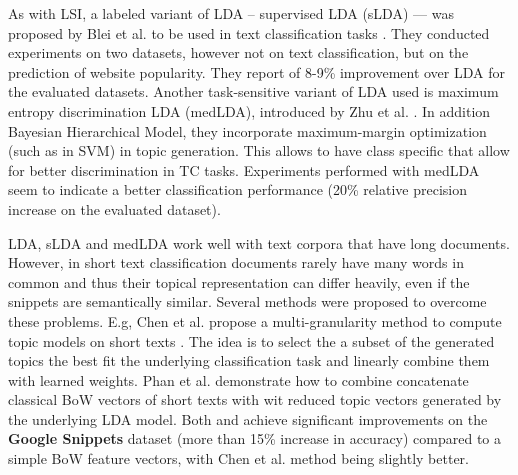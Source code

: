 As with LSI, a labeled variant of LDA -- supervised LDA (sLDA) --- was 
proposed by Blei et al. to be used in text classification tasks \cite{Blei2010}.
They conducted experiments on two datasets, however not on text classification, but on the prediction of
website popularity. They report of 8-9\% improvement over LDA for the evaluated
datasets. Another task-sensitive variant of LDA used is maximum entropy
discrimination LDA (medLDA), introduced by Zhu et al.
\cite{Zhu2012}. In addition Bayesian Hierarchical Model, they incorporate
maximum-margin optimization (such as in SVM) in topic generation. This allows to
have class specific that allow for better discrimination in TC tasks.
Experiments performed with medLDA seem to indicate a better classification
performance (20\% relative precision increase on the evaluated dataset).

LDA, sLDA and medLDA work well with text corpora that have long documents.
However, in short text classification documents rarely have many words in common
and thus their topical representation can differ heavily, even if the snippets are
semantically similar. 
Several methods were proposed to overcome these problems. E.g, 
Chen et al. propose a multi-granularity method to compute topic models
on short texts \cite{Chen2011}. The idea is to select the a subset of the
generated topics the best fit the underlying classification task and linearly
combine them with learned weights. Phan et al. \cite{phan2008learning}
demonstrate how to combine concatenate classical BoW vectors of short texts
with wit reduced topic vectors generated by the underlying LDA model. Both 
\cite{Chen2011} and \cite{phan2008learning} achieve significant improvements on
the \textbf{Google Snippets} dataset (more than 15\% increase in accuracy)
compared to a simple BoW feature vectors, with Chen et al.
\cite{Chen2011} method being slightly better.
  
